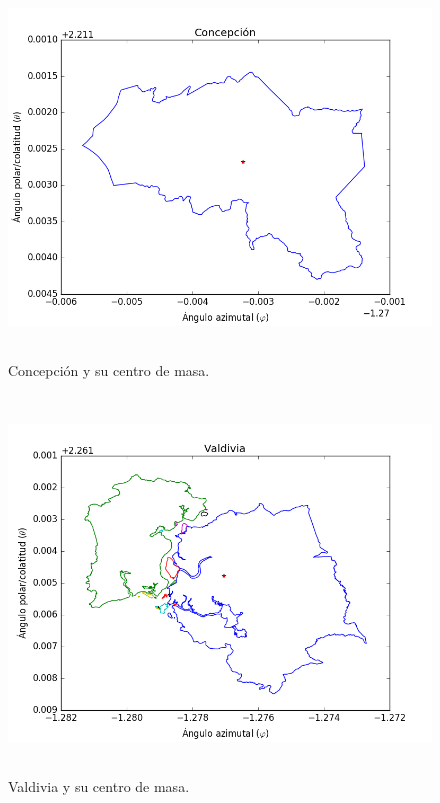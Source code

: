 \documentclass[20pt]{report}
\begin{document}
\begin{itemize}
\begin{figure}[H]
\begin{center}
\includegraphics[width=15cm, height=10cm]{FiguraCentroDeMasaComunal141.png}
\vspace{-0.5cm} %
\caption{Concepci\'on y su centro de masa.}
\label{Label para referencia}
\end{center}
\end{figure}
\begin{figure}[H]
\begin{center}
\includegraphics[width=15cm, height=10cm]{FiguraCentroDeMasaComunal238.png}
\vspace{-0.5cm} %
\caption{Valdivia y su centro de masa.}

\end{center}
\end{figure}
\end{itemize}
\end{document}
